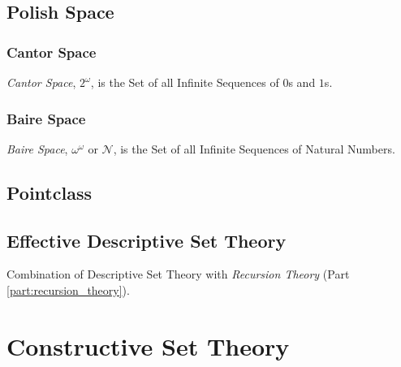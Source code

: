 \subsection{Polish Space}\label{sec:polish_space}

\subsubsection{Cantor Space}\label{sec:cantor_space}

\emph{Cantor Space}, $2^{\omega}$, is the Set of all Infinite
Sequences of $0$s and $1$s.



\subsubsection{Baire Space}\label{sec:baire_space}

\emph{Baire Space}, $\omega^{\omega}$ or $\mathcal{N}$, is the Set of
all Infinite Sequences of Natural Numbers.



\subsection{Pointclass}\label{sec:pointclass}

\subsection{Effective Descriptive Set Theory}
\label{sec:effective_descriptive}

Combination of Descriptive Set Theory with \emph{Recursion Theory}
(Part \ref{part:recursion_theory}).



\section{Constructive Set Theory}\label{sec:constructive_set_theory}

